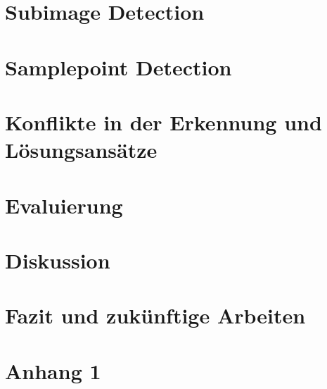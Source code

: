 \documentclass[pdftex,12pt,a4paper]{report}
\begin{document}

\chapter{Subimage Detection}
\label{chp:subimage}



\chapter{Samplepoint Detection}
\label{chp:samplepoint}



\chapter{Konflikte in der Erkennung und Lösungsansätze}
\label{chp:conflicts}



\chapter{Evaluierung}
\label{chp:evaluation}



\chapter{Diskussion}
\label{chp:discussion}



\chapter{Fazit und zukünftige Arbeiten}
\label{chp:fazit}




\appendix


\chapter{Anhang 1}
\end{document}
